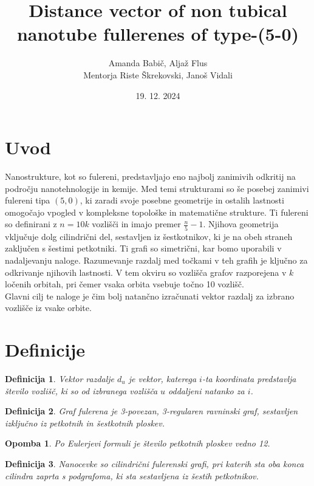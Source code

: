 \documentclass[a4paper, 12pt]{article}
\title{
    Distance vector of non tubical nanotube fullerenes of type-(5-0)
}
\author{Amanda Babič, Aljaž Flus \\
        {\small Mentorja Riste Škrekovski, Janoš Vidali}}
\date{19. 12. 2024}
\newtheorem{definicija}{Definicija}[section]
\newtheorem{opomba}{Opomba}[section]
\begin{document}
\maketitle
\section{Uvod}

Nanostrukture, kot so fulereni, predstavljajo eno najbolj zanimivih odkritij na področju nanotehnologije in kemije. Med temi strukturami so še posebej zanimivi fulereni tipa $(5,0)$, ki zaradi svoje posebne geometrije in ostalih lastnosti omogočajo vpogled v kompleksne topološke in matematične strukture.  
Ti fulereni so definirani z $n=10k$ vozlišči in imajo premer $\frac{n}{5}-1$. 
Njihova geometrija vključuje dolg cilindrični del, sestavljen iz šestkotnikov, ki je na obeh straneh zaključen s šestimi petkotniki.  
Ti grafi so simetrični, kar bomo uporabili v nadaljevanju naloge. Razumevanje razdalj med točkami v teh grafih je ključno za odkrivanje njihovih lastnosti. V tem okviru so vozlišča grafov razporejena v $k$ ločenih orbitah, pri čemer vsaka orbita vsebuje točno 10 vozlišč.  \\
Glavni cilj te naloge je čim bolj natančno izračunati vektor razdalj za izbrano vozlišče iz vsake orbite.

\section{Definicije}

\begin{definicija}
    Vektor razdalje $d_{u}$ je vektor, katerega $i$-ta koordinata predstavlja število vozlišč, ki so od izbranega vozlišča $u$ oddaljeni natanko za $i$. 
\end{definicija}

\begin{definicija}
    Graf fulerena je 3-povezan, 3-regularen ravninski graf, sestavljen izključno iz petkotnih in šestkotnih ploskev.
\end{definicija}

\begin{opomba}
    Po Eulerjevi formuli je število petkotnih ploskev vedno 12.
\end{opomba}

\begin{definicija}
    Nanocevke so cilindrični fulerenski grafi, pri katerih sta oba konca cilindra zaprta s podgrafoma, ki sta sestavljena iz šestih petkotnikov.
\end{definicija}
\end{document}
